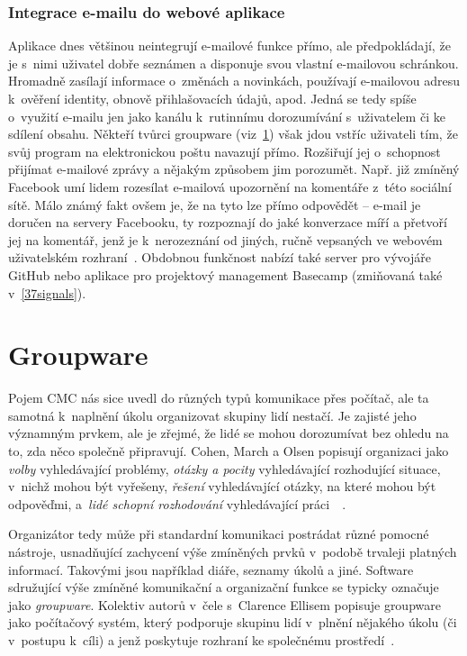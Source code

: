\documentclass[12pt,oneside,final]{fithesis2}
\begin{document}
\subsubsection*{Integrace e-mailu do webové aplikace}\label{emailWebApp}
Aplikace dnes většinou neintegrují e-mailové funkce přímo, ale předpokládají, že je s~nimi uživatel dobře seznámen a disponuje svou vlastní e-mailovou schránkou. Hromadně zasílají informace o~změnách a novinkách, používají e-mailovou adresu k~ověření identity, obnově přihlašovacích údajů, apod. Jedná se tedy spíše o~využití e-mailu jen jako kanálu k~rutinnímu dorozumívání s~uživatelem či ke sdílení obsahu. Někteří tvůrci groupware (viz~\ref{groupware}) však jdou vstříc uživateli tím, že svůj program na elektronickou poštu navazují přímo. Rozšiřují jej o~schopnost přijímat e-mailové zprávy a nějakým způsobem jim porozumět. Např. již zmíněný Facebook umí lidem rozesílat e-mailová upozornění na komentáře z~této sociální sítě. Málo známý fakt ovšem je, že na tyto lze přímo odpovědět -- e-mail je doručen na servery Facebooku, ty rozpoznají do jaké konverzace míří a přetvoří jej na komentář, jenž je k~nerozeznání od jiných, ručně vepsaných ve webovém uživatelském rozhraní~\cite{whitnah2010replying}. Obdobnou funkčnost nabízí také server pro vývojáře GitHub nebo aplikace pro projektový management Basecamp (zmiňovaná také v~\ref{37signals}).


\section{Groupware}\label{groupware}
Pojem CMC nás sice uvedl do různých typů komunikace přes počítač, ale ta samotná k~naplnění úkolu organizovat skupiny lidí nestačí. Je zajisté jeho významným prvkem, ale je zřejmé, že lidé se mohou dorozumívat bez ohledu na to, zda něco společně připravují. Cohen, March a Olsen popisují organizaci jako \emph{volby} vyhledávající problémy, \emph{otázky a pocity} vyhledávající rozhodující situace, v~nichž mohou být vyřešeny, \emph{řešení} vyhledávající otázky, na které mohou být odpověďmi, a~\emph{lidé schopní rozhodování} vyhledávající práci~\cite{cohen1972garbage}~\cite{grudin1994groupware}.

Organizátor tedy může při standardní komunikaci postrádat různé pomocné nástroje, usnadňující zachycení výše zmíněných prvků v~podobě trvaleji platných informací. Takovými jsou například diáře, seznamy úkolů a jiné. Software sdružující výše zmíněné komunikační a organizační funkce se typicky označuje jako \emph{groupware}. Kolektiv autorů v~čele s~Clarence Ellisem popisuje groupware jako počítačový systém, který podporuje skupinu lidí v~plnění nějakého úkolu (či v~postupu k~cíli) a jenž poskytuje rozhraní ke společnému prostředí~\cite{ellis1991groupware}.
\end{document}
